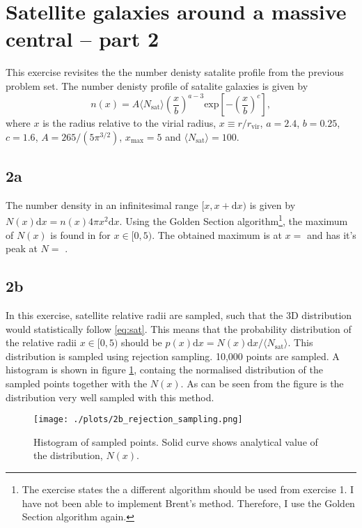 \section{Satellite galaxies around a massive central – part 2}
This exercise revisites the the number denisty satalite profile from the previous problem set. The number denisty profile of satalite galaxies is given by
\begin{equation}\label{eq:sat}
  n(x) = A \langle N_\mathrm{sat}\rangle \left( \frac{x}{b} \right) ^{a-3} \mathrm{exp} \left[ - \left( \frac{x}{b} \right)^{c} \right],
\end{equation}
where $x$ is the radius relative to the virial radius, $x\equiv r/r_\mathrm{vir}$, $a = 2.4$, $b = 0.25$, $c = 1.6$, $A=265/(5\pi^{3/2})$, $x_\mathrm{max}=5$ and $\langle N_\mathrm{sat} \rangle = 100$.

\subsection*{2a}
The number density in an infinitesimal range $[x,x+\mathrm{d}x)$ is given by $N(x)\mathrm{d}x = n(x)4\pi x^2\mathrm{d}x$. Using the Golden Section algorithm\footnote{The exercise states the a different algorithm should be used from exercise 1. I have not been able to implement Brent's method. Therefore, I use the Golden Section algorithm again.}, the maximum of $N(x)$ is found in for $x \in [0,5)$. The obtained maximum is at $x =$  and has it's peak at $N = $ .

\subsection*{2b}\label{sec:2b}
In this exercise, satellite relative radii are sampled, such that the 3D distribution would statistically follow \ref{eq:sat}. This means that the probability distribution of the relative radii $x \in [0,5)$ should be $p(x)\mathrm{d}x = N(x)\mathrm{d}x/\langle N_\mathrm{sat} \rangle$. This distribution is sampled using rejection sampling. 10,000 points are sampled. A histogram is shown in figure \ref{fig:2b}, containg the normalised distribution of the sampled points together with the $N(x)$. As can be seen from the figure is the distribution very well sampled with this method.

\begin{figure}[!ht]
  \centering
  \texttt{[image: ./plots/2b\_rejection\_sampling.png]}
  \caption{Histogram of sampled points. Solid curve shows analytical value of the distribution, $N(x)$.}
  \label{fig:2b}
\end{figure}

